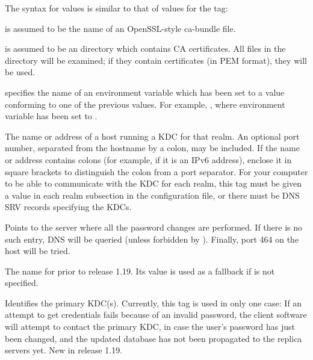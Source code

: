 \documentclass[letterpaper,10pt,english]{sphinxmanual}
\begin{document}
\begin{description}
The syntax for values is similar to that of values for the
 tag:

 

 is assumed to be the name of an OpenSSL-style ca-bundle file.

 

 is assumed to be an directory which contains CA certificates.
All files in the directory will be examined; if they contain certificates
(in PEM format), they will be used.

 

 specifies the name of an environment variable which has been set
to a value conforming to one of the previous values.  For example,
, where environment variable  has
been set to .

\item[{\sphinxstylestrong{kdc}}] \leavevmode
The name or address of a host running a KDC for that realm.  An
optional port number, separated from the hostname by a colon, may
be included.  If the name or address contains colons (for example,
if it is an IPv6 address), enclose it in square brackets to
distinguish the colon from a port separator.  For your computer to
be able to communicate with the KDC for each realm, this tag must
be given a value in each realm subsection in the configuration
file, or there must be DNS SRV records specifying the KDCs.

\item[{\sphinxstylestrong{kpasswd\_server}}] \leavevmode
Points to the server where all the password changes are performed.
If there is no such entry, DNS will be queried (unless forbidden
by ).  Finally, port 464 on the 
host will be tried.

\item[{\sphinxstylestrong{master\_kdc}}] \leavevmode
The name for  prior to release 1.19.  Its value is
used as a fallback if  is not specified.

\item[{\sphinxstylestrong{primary\_kdc}}] \leavevmode
Identifies the primary KDC(s).  Currently, this tag is used in only
one case: If an attempt to get credentials fails because of an
invalid password, the client software will attempt to contact the
primary KDC, in case the user’s password has just been changed, and
the updated database has not been propagated to the replica
servers yet.  New in release 1.19.


\end{description}
\end{document}
